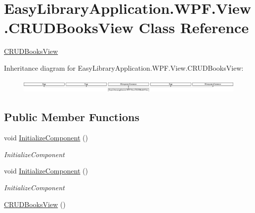 \hypertarget{class_easy_library_application_1_1_w_p_f_1_1_view_1_1_c_r_u_d_books_view}{}\section{Easy\+Library\+Application.\+W\+P\+F.\+View.\+C\+R\+U\+D\+Books\+View Class Reference}
\label{class_easy_library_application_1_1_w_p_f_1_1_view_1_1_c_r_u_d_books_view}


\mbox{\hyperlink{class_easy_library_application_1_1_w_p_f_1_1_view_1_1_c_r_u_d_books_view}{C\+R\+U\+D\+Books\+View}}  


Inheritance diagram for Easy\+Library\+Application.\+W\+P\+F.\+View.\+C\+R\+U\+D\+Books\+View\+:\begin{figure}[H]
\begin{center}
\leavevmode
\includegraphics[height=0.711111cm]{class_easy_library_application_1_1_w_p_f_1_1_view_1_1_c_r_u_d_books_view}
\end{center}
\end{figure}
\subsection*{Public Member Functions}
\begin{DoxyCompactItemize}
\item 
void \mbox{\hyperlink{class_easy_library_application_1_1_w_p_f_1_1_view_1_1_c_r_u_d_books_view_a90f294791c1a951399e01b50016e5b48}{Initialize\+Component}} ()
\begin{DoxyCompactList}\small\item\em Initialize\+Component \end{DoxyCompactList}\item 
void \mbox{\hyperlink{class_easy_library_application_1_1_w_p_f_1_1_view_1_1_c_r_u_d_books_view_a90f294791c1a951399e01b50016e5b48}{Initialize\+Component}} ()
\begin{DoxyCompactList}\small\item\em Initialize\+Component \end{DoxyCompactList}\item 
\mbox{\hyperlink{class_easy_library_application_1_1_w_p_f_1_1_view_1_1_c_r_u_d_books_view_adf8ec755e55a85b6c071b55bc234c731}{C\+R\+U\+D\+Books\+View}} ()
\end{DoxyCompactItemize}


